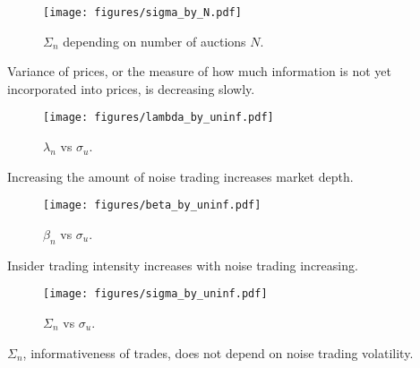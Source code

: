\documentclass{beamer}
\begin{document}
\begin{frame}
    \begin{figure}\label{fig:sigma_on_N}
        \texttt{[image: figures/sigma\_by\_N.pdf]}
        \caption{$\Sigma_n$ depending on number of auctions $N$.}

    \end{figure}

    Variance of prices, or the measure of how much information is not yet incorporated into prices, is decreasing slowly.
\end{frame}

\begin{frame}
    \begin{figure}\label{fig:lambda_on_uninf}
        \texttt{[image: figures/lambda\_by\_uninf.pdf]}
        \caption{$\lambda_n$ vs $\sigma_u$.}
    \end{figure}

    Increasing the amount of noise trading increases market depth.
\end{frame}

\begin{frame}
    \begin{figure}\label{fig:beta_on_uninf}
        \texttt{[image: figures/beta\_by\_uninf.pdf]}
        \caption{$\beta_n$ vs $\sigma_u$.}
    \end{figure}

    Insider trading intensity increases with noise trading increasing.
\end{frame}

\begin{frame}
    \begin{figure}\label{fig:sigma_on_uninf}
        \texttt{[image: figures/sigma\_by\_uninf.pdf]}
        \caption{$\Sigma_n$ vs $\sigma_u$.}
    \end{figure}

    $\Sigma_n$, informativeness of trades, does not depend on noise trading volatility.
\end{frame}
\end{document}
